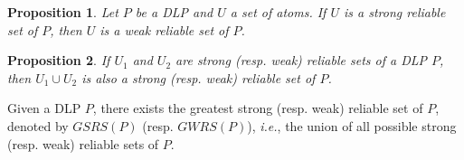 \documentclass{article}
\makeatletter
\newenvironment{tight_itemize}{
\begin{itemize}
   \setlength{\itemsep}{0pt}%
  \setlength{\topsep}{0pt}%
  \setlength{\partopsep}{0pt}%
  \setlength{\parskip}{0pt}%
  \setlength{\parsep}{0pt}%
}{\end{itemize}}
\newtheorem{proposition}{Proposition}
\newcommand\ie{{\it i.e.\@}}
\newcommand{\GSRS}{G\!S\!R\!S}
\newcommand{\GWRS}{G\!W\!R\!S}
\makeatother
\begin{document}
\begin{proposition}
Let $P$ be a DLP and $U$ a set of atoms. If $U$ is a strong reliable set of $P$, then $U$ is a weak reliable set of $P$.
\end{proposition}


\begin{proposition}
  If $U_1$ and $U_2$ are strong (resp. weak) reliable sets of a DLP $P$, then $U_1\cup U_2$ is also a strong (resp. weak) reliable set of $P$.
\end{proposition}
Given a DLP $P$, there exists the greatest strong (resp. weak) reliable set of $P$, denoted by $\GSRS(P)$ (resp. $\GWRS(P)$), \ie, the union of all possible strong (resp. weak) reliable sets of $P$.
\end{document}
